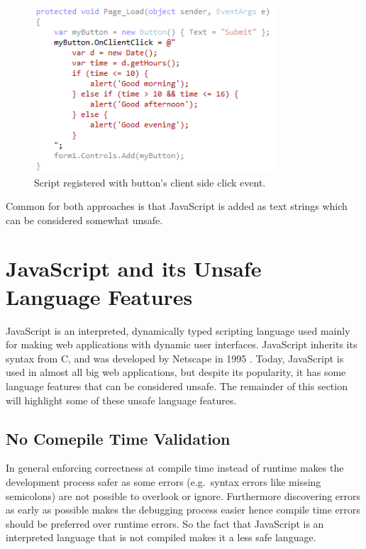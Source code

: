 		\begin{figure}[H]
			\includegraphics[width=9cm]{resources/images/ButtonScript.png}
			\caption{Script registered with button's client side click event.}
			\label{buttonScript}
		\end{figure}

		Common for both approaches is that JavaScript is added as text strings which can be considered somewhat unsafe.



\section{JavaScript and its Unsafe Language Features} %
\label{sec:javascript_and_its_unsafe_language_feature}
	
	JavaScript is an interpreted, dynamically typed scripting language used mainly for making web applications with dynamic user interfaces. JavaScript inherits its syntax from C, and was developed by Netscape in 1995 \cite{bib:wiki_javascript}. Today, JavaScript is used in almost all big web applications, but despite its popularity, it has some language features that can be considered unsafe. The remainder of this section will highlight some of these unsafe language features.

	\subsection{No Comepile Time Validation} %
	\label{sub:no_compile_time_validation}
		In general enforcing correctness at compile time instead of runtime makes the development process safer as some errors (e.g.\ syntax errors like missing semicolons) are not possible to overlook or ignore. Furthermore discovering errors as early as possible makes the debugging process easier hence compile time errors should be preferred over runtime errors. So the fact that JavaScript is an interpreted language that is not compiled makes it a less safe language.

